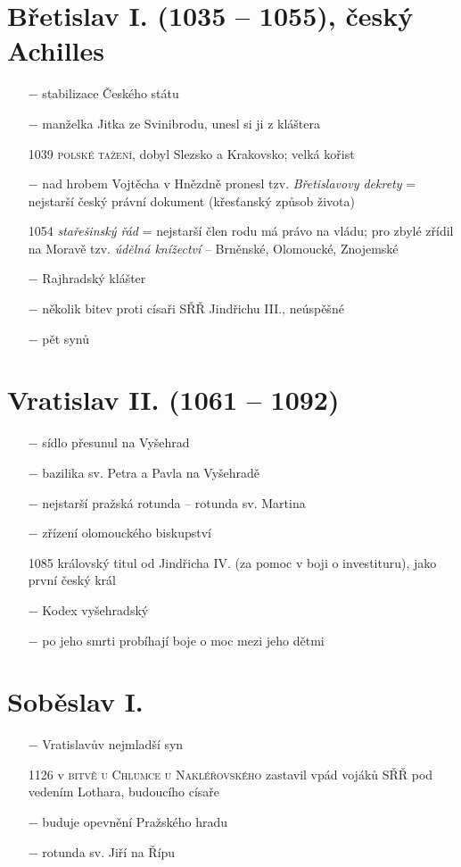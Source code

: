 \documentclass{article}
\begin{document}
\section*{Břetislav I. (1035 -- 1055), český Achilles}
\begin{itemize}
    \vspace{-0.5em}
    \setlength\itemsep{0.15em}
    \item[$-$] stabilizace Českého státu
    \item[$-$] manželka Jitka ze Svinibrodu, unesl si ji z kláštera
    \item[1039] \textsc{polské tažení}, dobyl Slezsko a Krakovsko; velká kořist
    \item[$-$] nad hrobem Vojtěcha v Hnězdně pronesl tzv. \textit{Břetislavovy dekrety} = nejstarší český právní dokument (křesťanský způsob života)
    \item[1054] \textit{stařešinský řád} = nejstarší člen rodu má právo na vládu; pro zbylé zřídil na Moravě tzv. \textit{údělná knížectví} -- Brněnské, Olomoucké, Znojemské
    \item[$-$] Rajhradský klášter
    \item[$-$] několik bitev proti císaři SŘŘ Jindřichu III., neúspěšné
    \item[$-$] pět synů
\end{itemize}

\section*{Vratislav II. (1061 -- 1092)}
\begin{itemize}
    \vspace{-0.5em}
    \setlength\itemsep{0.15em}
    \item[$-$] sídlo přesunul na Vyšehrad
    \item[$-$] bazilika sv. Petra a Pavla na Vyšehradě
    \item[$-$] nejstarší pražská rotunda -- rotunda sv. Martina
    \item[$-$] zřízení olomouckého biskupství
    \item[1085] královský titul od Jindřicha IV. (za pomoc v boji o investituru), jako první český král
    \item[$-$] Kodex vyšehradský
    \item[$-$] po jeho smrti probíhají boje o moc mezi jeho dětmi
\end{itemize}

\section*{Soběslav I.}
\begin{itemize}
    \vspace{-0.5em}
    \setlength\itemsep{0.15em}
    \item[$-$] Vratislavův nejmladší syn
    \item[1126] v \textsc{bitvě u Chlumce u Nakléřovského} zastavil vpád vojáků SŘŘ pod vedením Lothara, budoucího císaře
    \item[$-$] buduje opevnění Pražského hradu
    \item[$-$] rotunda sv. Jiří na Řípu
\end{itemize}
\end{document}
